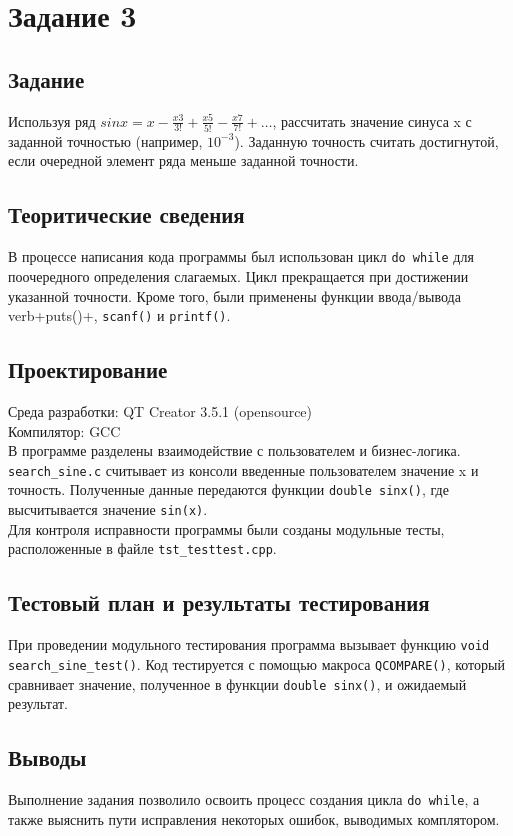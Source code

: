 \documentclass[12pt,a4paper]{report}
\begin{document}
\section{Задание 3}
\subsection{Задание}
Используя ряд $sin x = x - \frac{x3}{3!} + \frac{x5}{5!} - \frac{x7}{7!} + …$, рассчитать значение синуса x с заданной точностью (например, $10^{-3}$). Заданную точность считать достигнутой, если очередной элемент ряда меньше заданной точности.

\subsection{Теоритические сведения}
В процессе написания кода программы был использован цикл \verb+do while+ для поочередного определения слагаемых. Цикл прекращается при достижении указанной точности. Кроме того, были применены функции ввода/вывода \\verb+puts()+, \verb+scanf()+ и \verb+printf()+.
  
\subsection{Проектирование}
Среда разработки: QT Creator 3.5.1 (opensource)
\\
Компилятор: GCC
\\
В программе разделены взаимодействие с пользователем и бизнес-логика. \verb+search_sine.c+ считывает из консоли введенные пользователем значение x и точность. Полученные данные передаются функции \verb+double sinx()+, где высчитывается значение \verb+sin(x)+.
\\
Для контроля исправности программы были созданы модульные тесты, расположенные в файле \verb+tst_testtest.cpp+.


\subsection{Тестовый план и результаты тестирования}
При проведении модульного тестирования программа вызывает функцию \verb+void search_sine_test()+. Код тестируется с помощью макроса \verb+QCOMPARE()+, который сравнивает значение, полученное в функции \verb+double sinx()+, и ожидаемый результат. 

\subsection{Выводы}
Выполнение задания позволило освоить процесс создания цикла \verb+do while+, а также выяснить пути исправления некоторых ошибок, выводимых комплятором.
\end{document}
